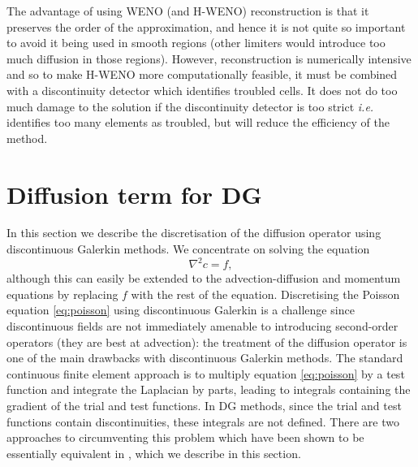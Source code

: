 The advantage of using WENO (and H-WENO) reconstruction is that it
preserves the order of the approximation, and hence it is not quite so
important to avoid it being used in smooth regions (other limiters
would introduce too much diffusion in those regions). However,
reconstruction is numerically intensive and so to make H-WENO more
computationally feasible, it must be combined with a discontinuity
detector which identifies troubled cells. It does not do too much
damage to the solution if the discontinuity detector is too strict
\emph{i.e.}  identifies too many elements as troubled, but will reduce
the efficiency of the method.

\section{Diffusion term for DG}
\label{sec:NM_DG_diffusion}
 In this section we describe
the discretisation of the diffusion operator using discontinuous
Galerkin methods. We concentrate on solving the equation
\begin{equation}
\label{eq:poisson}
\nabla^2 c = f,
\end{equation}
although this can easily be extended to the advection-diffusion and
momentum equations by replacing $f$ with the rest of the equation.
Discretising the Poisson equation \eqref{eq:poisson} using
discontinuous Galerkin is a challenge since discontinuous fields are
not immediately amenable to introducing second-order operators (they
are best at advection): the treatment of the diffusion operator is one
of the main drawbacks with discontinuous Galerkin methods.  The
standard continuous finite element approach is to multiply equation
\eqref{eq:poisson} by a test function and integrate the Laplacian by
parts, leading to integrals containing the gradient of the trial and
test functions. In DG methods, since the trial and test functions contain
discontinuities, these integrals are not defined. There are two
approaches to circumventing this problem which have been shown to be
essentially equivalent in \cite{arnold2002}, which we describe in this
section.

